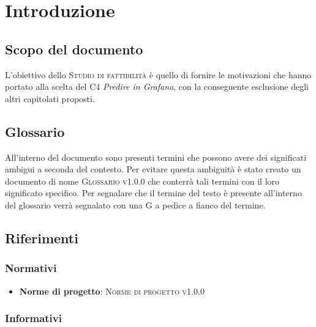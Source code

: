 \documentclass{article}
\begin{document}


\section{Introduzione}%
\label{sec:introduzione}

\subsection{Scopo del documento}%
\label{sub:scopo_del_documento}
L'obiettivo dello \textsc{Studio di fattibilità} è quello di fornire le motivazioni che hanno portato alla scelta del  C4 \emph{Predire in Grafana}, con la conseguente esclusione degli altri capitolati proposti.

\subsection{Glossario}%
\label{sub:glossario}
All'interno del documento sono presenti termini che possono avere dei significati ambigui a seconda del contesto. Per evitare questa ambiguità è stato creato un documento di nome \textsc{Glossario v1.0.0} che conterrà tali termini con il loro significato specifico. Per segnalare che il termine del testo è presente all'interno del glossario verrà segnalato con una G a pedice a fianco del termine.

\subsection{Riferimenti}%
\label{sub:riferimenti}

\subsubsection{Normativi}%
\label{subs:normativi}

\begin{itemize}
  \item \textbf{Norme di progetto}: \textsc{Norme di progetto v1.0.0}
\end{itemize}

\subsubsection{Informativi}%
\label{subs:informativi}
\end{document}
